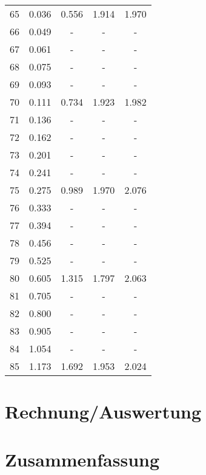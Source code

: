 \documentclass[a4paper]{article}
\begin{document}
\begin{table}
\begin{tabular}{|c|c|c|c|c|}
 65 & 0.036 & 0.556 & 1.914 & 1.970 \\
 66 & 0.049 & -  & -  & -  \\
 67 & 0.061 & -  & -  & -  \\
 68 & 0.075 & -  & -  & -  \\
 69 & 0.093 & -  & -  & -  \\
 70 & 0.111 & 0.734 & 1.923 & 1.982 \\
 71 & 0.136 & -  & -  & -  \\
 72 & 0.162 & -  & -  & -  \\
 73 & 0.201 & -  & -  & -  \\
 74 & 0.241 & -  & -  & -  \\
 75 & 0.275 & 0.989 & 1.970 & 2.076 \\
 76 & 0.333 & -  & -  & -  \\
 77 & 0.394 & -  & -  & -  \\
 78 & 0.456 & -  & -  & -  \\
 79 & 0.525 & -  & -  & -  \\
 80 & 0.605 & 1.315 & 1.797 & 2.063 \\
 81 & 0.705 & -  & -  & -  \\
 82 & 0.800 & -  & -  & -  \\
 83 & 0.905 & -  & -  & -  \\
 84 & 1.054 & -  & -  & -  \\
 85 & 1.173 & 1.692 & 1.953 & 2.024
 
  \end{tabular}
  \label{tab:ref_int}
\end{table}

\section{Rechnung/Auswertung}
\section{Zusammenfassung}
\end{document}
